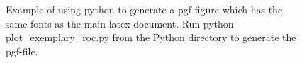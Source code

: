 



\graphicspath{{5/figures/}}


\begin{figure}[htb]
  \centering

\resizebox{1\textwidth}{!}{}

  \caption[Example of a ROC curve]{ Example of using python to generate a pgf-figure which has the same fonts as the main latex document. Run python plot\_exemplary\_roc.py from the Python directory to generate the pgf-file. }
  \label{fig:ROC_curve}
\end{figure}  





